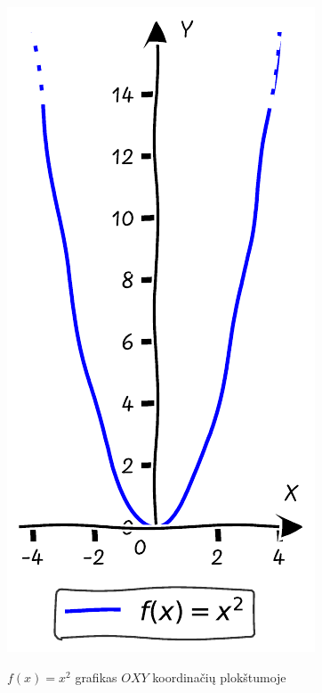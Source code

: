\documentclass{tufte-handout}
\begin{document}
\begin{marginfigure}%

  \includegraphics[width=\linewidth]{./graphs/quadratic_function_plot_example.pdf}
  \caption{$f(x)=x^2$ grafikas $OXY$ koordinačių plokštumoje}
  \label{fig:example_quadratic_plot}
\end{marginfigure}
\end{document}
